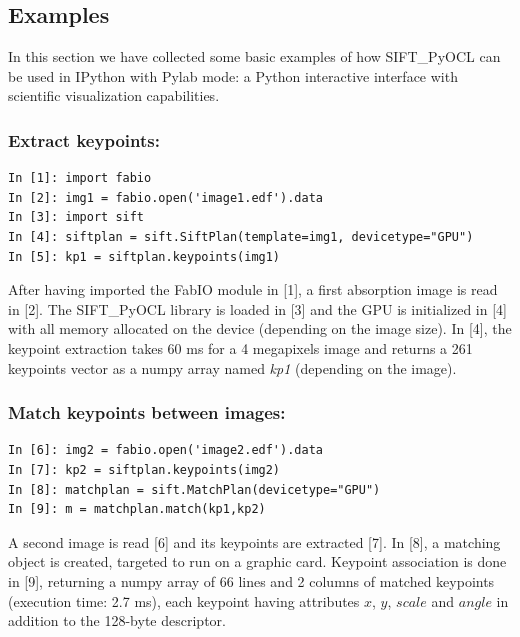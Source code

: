 \documentclass[preprint]{iucr}
\begin{document}
\subsection{Examples}

In this section we have collected some basic examples of how
SIFT\_PyOCL can be used in IPython \cite{ipython} with Pylab \cite{matplotlib}
mode: a Python interactive interface with scientific visualization
capabilities.

\subsubsection{Extract keypoints:}
\begin{verbatim}
In [1]: import fabio
In [2]: img1 = fabio.open('image1.edf').data
In [3]: import sift
In [4]: siftplan = sift.SiftPlan(template=img1, devicetype="GPU")
In [5]: kp1 = siftplan.keypoints(img1)
\end{verbatim}

After having imported the FabIO \cite{fabio} module in [1], a first
absorption image is read in [2]. The SIFT\_PyOCL library is loaded in [3] and the
GPU is initialized in [4] with all memory allocated on the device (depending on
the image size).
In [4], the keypoint extraction takes 60 ms for a
4 megapixels image and returns a 261 keypoints vector as a numpy array named
\emph{kp1} (depending on the image).

\subsubsection{Match keypoints between images:}
\begin{verbatim}
In [6]: img2 = fabio.open('image2.edf').data
In [7]: kp2 = siftplan.keypoints(img2)
In [8]: matchplan = sift.MatchPlan(devicetype="GPU")
In [9]: m = matchplan.match(kp1,kp2)
\end{verbatim}
A second image is read [6] and its keypoints are extracted [7].
In [8], a matching object is created, targeted to run on a graphic card.
Keypoint association is done in [9], returning a numpy array of 66 lines and 2
columns of matched keypoints (execution time: 2.7 ms), each keypoint having
attributes $x$, $y$, $scale$ and $angle$ in addition to the 128-byte descriptor.
\end{document}
